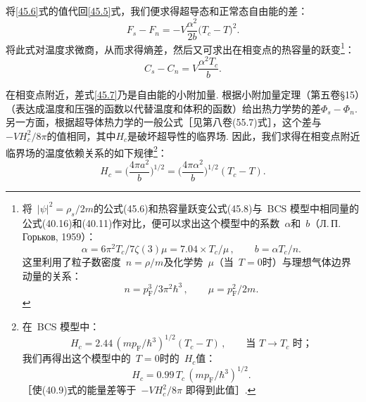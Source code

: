 将\eqref{45.6}式的值代回\eqref{45.5}式，我们便求得超导态和正常态自由能的差：
\begin{equation}
F_s - F_n = -V\frac{\alpha^2}{2b}\bigl(T_c-T\bigr)^2.
\label{45.7}
\end{equation}
将此式对温度求微商，从而求得熵差，然后又可求出在相变点的热容量的跃变\footnote{将~$|\psi|^2=\rho_s/2m$的公式(45.6)和热容量跃变公式(45.8)与~BCS 模型中相同量的公式(40.16)和(40.11)作对比，便可以求出这个模型中的系数~$\alpha$和~$b$（Л.\,П.\,Горьков, 1959）：
\begin{equation*}
\alpha=6\pi^2T_c/7\zeta(3)\mu=7.04\times T_c/\mu\,,\qquad b=\alpha T_c/n.
\end{equation*}
这里利用了粒子数密度~$n=\rho/m$及化学势~$\mu$（当~$T=0$时）与理想气体边界动量的关系：
\begin{equation*}
n=p_{\mathrm F}^3/3\pi^2\hbar^3\,,\qquad \mu=p_{\mathrm F}^2/2m.
\end{equation*}}：
\begin{equation}
C_s - C_n = V\frac{\alpha^2T_c}{b}.
\label{45.8}
\end{equation}

在相变点附近，差式\eqref{45.7}乃是自由能的小附加量. 根据小附加量定理（第五卷§15）（表达成温度和压强的函数以代替温度和体积的函数）给出热力学势的差$\Phi_s-\Phi_n$. 另一方面，根据超导体热力学的一般公式［见第八卷(55.7)式］，这个差与$-VH_c^2/8\pi$的值相同，其中$H_c$是破坏超导性的临界场. 因此，我们求得在相变点附近临界场的温度依赖关系的如下规律\footnote{在~BCS 模型中：
\begin{equation*}
H_c=2.44\,(mp_{\mathrm F}/\hbar^3)^{1/2}(T_c-T)\,,\qquad \text{当~$T\to T_c$ 时；}
\end{equation*}
我们再得出这个模型中的~$T=0$时的~$H_c$值：
\begin{equation*}
H_c=0.99\,T_c\,(mp_{\mathrm F}/\hbar^3)^{1/2}.
\end{equation*}
［使(40.9)式的能量差等于~$-VH_c^2/8\pi$ 即得到此值］.}：
\begin{equation}
H_c = \Biggl(\frac{4\pi a^2}{b}\Biggr)^{1/2} = \Biggl(\frac{4\pi\alpha^2}{b}\Biggr)^{1/2}(T_c-T).
\label{45.9}
\end{equation}

